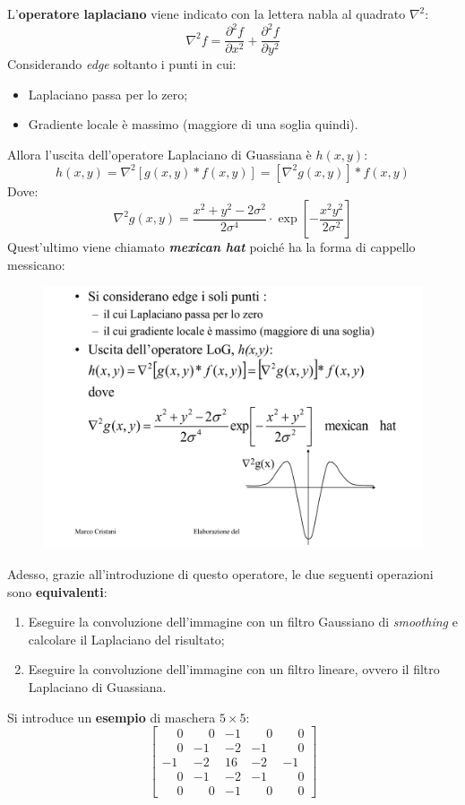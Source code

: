 \documentclass[a4paper]{article}
\begin{document}
	\noindent
	L'\textbf{operatore laplaciano} viene indicato con la lettera nabla al quadrato $\nabla^{2}$:
	\begin{equation*}
		\nabla^{2}f = \dfrac{\partial^{2} f}{\partial x^{2}} + \dfrac{\partial^{2}f}{\partial y^{2}}
	\end{equation*}
	Considerando \emph{edge} soltanto i punti in cui:
	\begin{itemize}
		\item Laplaciano passa per lo zero;
		\item Gradiente locale è massimo (maggiore di una soglia quindi).
	\end{itemize}
	Allora l'uscita dell'operatore Laplaciano di Guassiana è $h\left(x,y\right)$:
	\begin{equation*}
		h\left(x,y\right) = \nabla^{2}\left[g\left(x,y\right) * f\left(x,y\right)\right] = \left[\nabla^{2}g\left(x,y\right)\right] * f\left(x,y\right)
	\end{equation*}
	Dove:
	\begin{equation*}
		\nabla^{2}g\left(x,y\right) = \dfrac{x^{2}+y^{2}-2\sigma^{2}}{2\sigma^{4}} \cdot \exp\left[-\dfrac{x^{2}y^{2}}{2\sigma^{2}}\right]
	\end{equation*}
	Quest'ultimo viene chiamato \textbf{\emph{mexican hat}} poiché ha la forma di cappello messicano:
	\begin{figure}[!htp]
		\centering
		\includegraphics[width=.4\textwidth]{img/mexican_hat.pdf}
	\end{figure}
	
	\noindent
	Adesso, grazie all'introduzione di questo operatore, le due seguenti operazioni sono \textbf{equivalenti}:
	\begin{enumerate}
		\item Eseguire la convoluzione dell'immagine con un filtro Gaussiano di \emph{smoothing} e calcolare il Laplaciano del risultato;
		\item Eseguire la convoluzione dell'immagine con un filtro lineare, ovvero il filtro Laplaciano di Guassiana.
	\end{enumerate}
	Si introduce un \textbf{esempio} di maschera $5\times5$:
	\begin{equation*}
		\begin{bmatrix}
			\phantom{-}0 & \phantom{-}0 & -1 & \phantom{-}0 & \phantom{-}0 \\
			\phantom{-}0 & -1 			& -2 & -1 			& \phantom{-}0 \\
			-1 			 & -2 			& 16 & -2 			& -1 \\
			\phantom{-}0 & -1 			& -2 & -1 			& \phantom{-}0 \\
			\phantom{-}0 & \phantom{-}0 & -1 & \phantom{-}0 & \phantom{-}0
		\end{bmatrix}
	\end{equation*}\newpage
\end{document}
